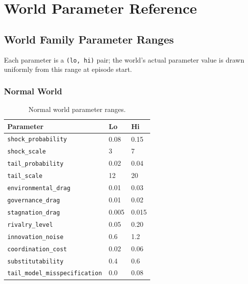 \chapter{World Parameter Reference}
\label{app:world-params}


\section{World Family Parameter Ranges}
\label{sec:world-ranges}

Each parameter is a \texttt{(lo, hi)} pair; the world's actual
parameter value is drawn uniformly from this range at episode start.

\subsection{Normal World}

\begin{table}[ht]
\centering
\small
\begin{tabularx}{\linewidth}{Xll}
\toprule
\textbf{Parameter} & \textbf{Lo} & \textbf{Hi} \\
\midrule
\texttt{shock\_probability} & 0.08 & 0.15 \\
\texttt{shock\_scale} & 3 & 7 \\
\texttt{tail\_probability} & 0.02 & 0.04 \\
\texttt{tail\_scale} & 12 & 20 \\
\texttt{environmental\_drag} & 0.01 & 0.03 \\
\texttt{governance\_drag} & 0.01 & 0.02 \\
\texttt{stagnation\_drag} & 0.005 & 0.015 \\
\texttt{rivalry\_level} & 0.05 & 0.20 \\
\texttt{innovation\_noise} & 0.6 & 1.2 \\
\texttt{coordination\_cost} & 0.02 & 0.06 \\
\texttt{substitutability} & 0.4 & 0.6 \\
\texttt{tail\_model\_misspecification} & 0.0 & 0.08 \\
\bottomrule
\end{tabularx}
\caption[Normal world parameters]{Normal world parameter ranges.}
\label{tab:world-normal}
\end{table}


